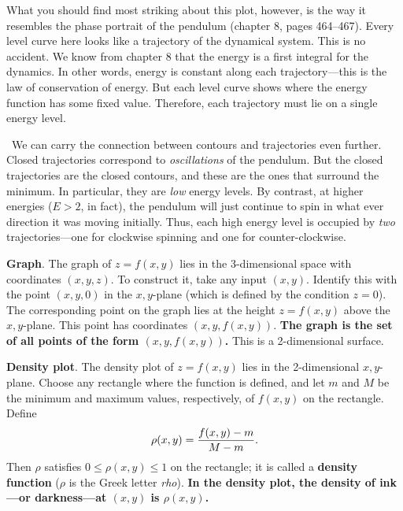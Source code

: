 {{{{	What you should find most striking about this plot, however, is the way it resembles the phase portrait of the pendulum (chapter 8, pages 464--467).  
Every level curve here looks like a trajectory of the dynamical system.  
This is no accident.  We know from chapter 8 that the energy is a first integral for the dynamics.  In other words, energy is constant along each trajectory---this is the law of conservation of energy.  But each level curve shows where the energy function has some fixed value.  Therefore, each trajectory must lie on a single energy level. 


\noindent
\quad \ We can carry the connection between contours and trajectories even further.  Closed trajectories correspond to {\em oscillations\/} of the pendulum.  But the closed trajectories are the closed contours, and these are the ones that surround the minimum.  In particular, they are {\em low\/} energy levels.  By contrast, at higher energies ($E > 2$, in fact), the pendulum will just continue to spin in what ever direction it was moving initially.  Thus, each high energy level is occupied by {\em two\/} trajectories---one for clockwise spinning and one for counter-clockwise.


{\bf Graph}.  The graph of $z = f(x, y)$ lies in the 3-dimensional space with coordinates $(x, y, z)$.  To construct it, take any input $(x, y)$.  Identify this with the point $(x, y, 0)$ in the $x, y$-plane (which is defined by the condition $z = 0$).  The corresponding point on the graph lies at the height $z = f(x, y)$ above the $x, y$-plane.  This point has coordinates $(x, y, f(x, y))$.   {\bf The graph is the set of all points of the form $(x, y, f(x, y))$.}  This is a 2-dimensional surface. 

\newpage

\hfill

{\bf Density plot}.  The density plot of $z = f(x, y)$ lies in the 2-dimensional $x, y$-plane.  Choose any rectangle where the function is defined, and let $m$ and $M$ be the minimum and maximum values, respectively, of $f(x, y)$ on the rectangle.  Define
	\[
\rho(x, y) = {f(x, y) - m \over M - m}.
\]
Then $\rho$ satisfies $0 \leq \rho(x, y) \leq 1$ on the rectangle; it is called a {\bf density function} ($\rho$ is the Greek letter {\em rho\/}).  {\bf In the density plot, the density of ink---or darkness---at $(x, y)$ is $\rho(x, y)$.}
\medskip


}}}}
